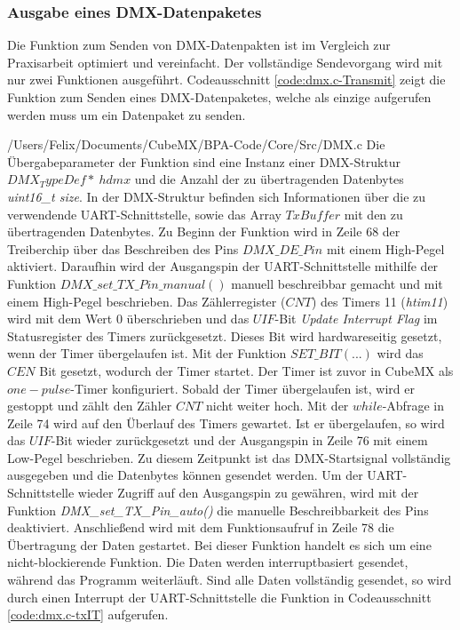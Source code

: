 \subsubsection{Ausgabe eines DMX-Datenpaketes}
Die Funktion zum Senden von DMX-Datenpakten ist im Vergleich zur Praxisarbeit optimiert und vereinfacht. Der vollständige Sendevorgang wird mit nur zwei Funktionen ausgeführt. Codeausschnitt \ref{code:dmx.c-Transmit} zeigt die Funktion zum Senden eines DMX-Datenpaketes, welche als einzige aufgerufen werden muss um ein Datenpaket zu senden.

{/Users/Felix/Documents/CubeMX/BPA-Code/Core/Src/DMX.c}
Die Übergabeparameter der Funktion sind eine Instanz einer DMX-Struktur $DMX_TypeDef*\ hdmx$ und die Anzahl der zu übertragenden Datenbytes \textit{uint16\_t size}. In der DMX-Struktur befinden sich Informationen über die zu verwendende UART-Schnittstelle, %
sowie das Array $TxBuffer$ mit den zu übertragenden Datenbytes. Zu Beginn der Funktion wird in Zeile 68 der Treiberchip über das Beschreiben des Pins $DMX\_DE\_Pin$ mit einem High-Pegel aktiviert. Daraufhin wird der Ausgangspin der UART-Schnittstelle mithilfe der Funktion $DMX\_set\_TX\_Pin\_manual()$ manuell beschreibbar gemacht und mit einem High-Pegel beschrieben.
Das Zählerregister ($CNT$) des Timers 11 (\textit{htim11}) wird mit dem Wert 0 überschrieben und das $UIF$-Bit \textit{Update Interrupt Flag} im Statusregister des Timers zurückgesetzt. Dieses Bit wird hardwareseitig gesetzt, wenn der Timer übergelaufen ist. Mit der Funktion $SET\_BIT(...)$ wird das $CEN$ Bit gesetzt, wodurch der Timer startet. Der Timer ist zuvor in CubeMX als $one-pulse$-Timer %
konfiguriert. Sobald der Timer übergelaufen ist, wird er gestoppt und zählt den Zähler $CNT$ nicht weiter hoch. Mit der $while$-Abfrage in Zeile 74 wird auf den Überlauf des Timers gewartet. Ist er übergelaufen, so wird das $UIF$-Bit wieder zurückgesetzt und der Ausgangspin in Zeile 76 mit einem Low-Pegel beschrieben. Zu diesem Zeitpunkt ist das DMX-Startsignal vollständig ausgegeben und die Datenbytes können gesendet werden. Um der UART-Schnittstelle wieder Zugriff auf den Ausgangspin zu gewähren, wird mit der Funktion \textit{DMX\_set\_TX\_Pin\_auto()} die manuelle Beschreibbarkeit des Pins deaktiviert. Anschließend wird mit dem Funktionsaufruf in Zeile 78 die Übertragung der Daten gestartet. Bei dieser Funktion handelt es sich um eine nicht-blockierende Funktion. Die Daten werden interruptbasiert gesendet, während das Programm weiterläuft. Sind alle Daten vollständig gesendet, so wird durch einen Interrupt der UART-Schnittstelle die Funktion in Codeausschnitt \ref{code:dmx.c-txIT} aufgerufen.
